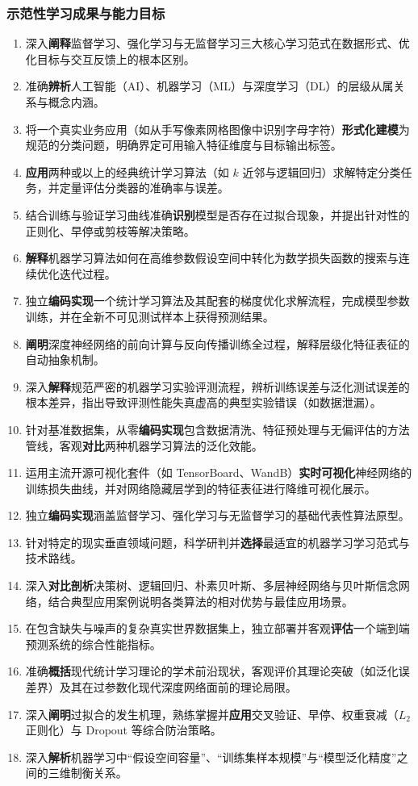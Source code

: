 \subsubsection{示范性学习成果与能力目标}
\begin{enumerate}
    \item 深入\textbf{阐释}监督学习、强化学习与无监督学习三大核心学习范式在数据形式、优化目标与交互反馈上的根本区别。
    \item 准确\textbf{辨析}人工智能（AI）、机器学习（ML）与深度学习（DL）的层级从属关系与概念内涵。
    \item 将一个真实业务应用（如从手写像素网格图像中识别字母字符）\textbf{形式化建模}为规范的分类问题，明确界定可用输入特征维度与目标输出标签。
    \item \textbf{应用}两种或以上的经典统计学习算法（如 $k$ 近邻与逻辑回归）求解特定分类任务，并定量评估分类器的准确率与误差。
    \item 结合训练与验证学习曲线准确\textbf{识别}模型是否存在过拟合现象，并提出针对性的正则化、早停或剪枝等解决策略。
    \item \textbf{解释}机器学习算法如何在高维参数假设空间中转化为数学损失函数的搜索与连续优化迭代过程。
    \item 独立\textbf{编码实现}一个统计学习算法及其配套的梯度优化求解流程，完成模型参数训练，并在全新不可见测试样本上获得预测结果。
    \item \textbf{阐明}深度神经网络的前向计算与反向传播训练全过程，解释层级化特征表征的自动抽象机制。
    \item 深入\textbf{解释}规范严密的机器学习实验评测流程，辨析训练误差与泛化测试误差的根本差异，指出导致评测性能失真虚高的典型实验错误（如数据泄漏）。
    \item 针对基准数据集，从零\textbf{编码实现}包含数据清洗、特征预处理与无偏评估的方法管线，客观\textbf{对比}两种机器学习算法的泛化效能。
    \item 运用主流开源可视化套件（如 TensorBoard、WandB）\textbf{实时可视化}神经网络的训练损失曲线，并对网络隐藏层学到的特征表征进行降维可视化展示。
    \item 独立\textbf{编码实现}涵盖监督学习、强化学习与无监督学习的基础代表性算法原型。
    \item 针对特定的现实垂直领域问题，科学研判并\textbf{选择}最适宜的机器学习学习范式与技术路线。
    \item 深入\textbf{对比剖析}决策树、逻辑回归、朴素贝叶斯、多层神经网络与贝叶斯信念网络，结合典型应用案例说明各类算法的相对优势与最佳应用场景。
    \item 在包含缺失与噪声的复杂真实世界数据集上，独立部署并客观\textbf{评估}一个端到端预测系统的综合性能指标。
    \item 准确\textbf{概括}现代统计学习理论的学术前沿现状，客观评价其理论突破（如泛化误差界）及其在过参数化现代深度网络面前的理论局限。
    \item 深入\textbf{阐明}过拟合的发生机理，熟练掌握并\textbf{应用}交叉验证、早停、权重衰减（$L_2$ 正则化）与 Dropout 等综合防治策略。
    \item 深入\textbf{解析}机器学习中“假设空间容量”、“训练集样本规模”与“模型泛化精度”之间的三维制衡关系。
\end{enumerate}

